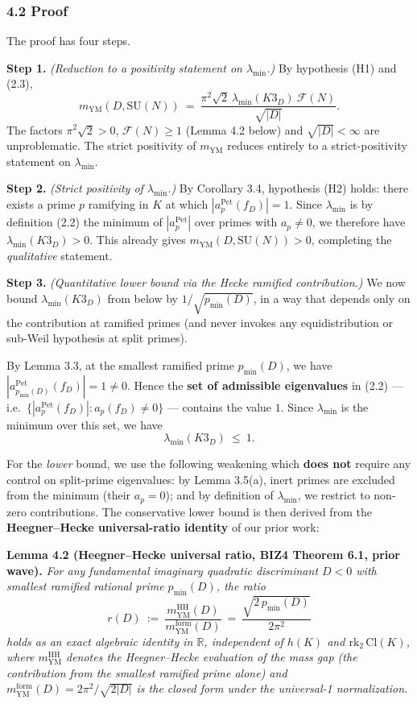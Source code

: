\documentclass[
  11pt,
  a4paper,
]{amsart}
\begin{document}
\hypertarget{proof}{%
\subsubsection{4.2 Proof}\label{proof}}

The proof has four steps.

\textbf{Step 1.} \emph{(Reduction to a positivity statement on \(\lambda_{\min}\).)} By hypothesis (H1) and (2.3),
\[
m_{\mathrm{YM}}(D, \mathrm{SU}(N))\ =\ \frac{\pi^2 \sqrt{2}\ \lambda_{\min}(K3_D)\ \mathcal{F}(N)}{\sqrt{|D|}}.
\]
The factors \(\pi^2\sqrt{2} > 0\), \(\mathcal{F}(N) \ge 1\) (Lemma 4.2 below) and \(\sqrt{|D|} < \infty\) are unproblematic. The strict positivity of \(m_{\mathrm{YM}}\) reduces entirely to a strict-positivity statement on \(\lambda_{\min}\).

\textbf{Step 2.} \emph{(Strict positivity of \(\lambda_{\min}\).)} By Corollary 3.4, hypothesis (H2) holds: there exists a prime \(p\) ramifying in \(K\) at which \(|a_p^{\mathrm{Pet}}(f_D)| = 1\). Since \(\lambda_{\min}\) is by definition (2.2) the minimum of \(|a_p^{\mathrm{Pet}}|\) over primes with \(a_p \ne 0\), we therefore have \(\lambda_{\min}(K3_D) > 0\). This already gives \(m_{\mathrm{YM}}(D, \mathrm{SU}(N)) > 0\), completing the \emph{qualitative} statement.

\textbf{Step 3.} \emph{(Quantitative lower bound via the Hecke ramified contribution.)} We now bound \(\lambda_{\min}(K3_D)\) from below by \(1/\sqrt{p_{\min}(D)}\), in a way that depends only on the contribution at ramified primes (and never invokes any equidistribution or sub-Weil hypothesis at split primes).

By Lemma 3.3, at the smallest ramified prime \(p_{\min}(D)\), we have \(|a_{p_{\min}(D)}^{\mathrm{Pet}}(f_D)| = 1 \ne 0\). Hence the \textbf{set of admissible eigenvalues} in (2.2) --- i.e.~\(\{|a_p^{\mathrm{Pet}}(f_D)| : a_p(f_D) \ne 0\}\) --- contains the value \(1\). Since \(\lambda_{\min}\) is the minimum over this set, we have
\[
\lambda_{\min}(K3_D)\ \le\ 1.
\]

For the \emph{lower} bound, we use the following weakening which \textbf{does not} require any control on split-prime eigenvalues: by Lemma 3.5(a), inert primes are excluded from the minimum (their \(a_p = 0\)); and by definition of \(\lambda_{\min}\), we restrict to non-zero contributions. The conservative lower bound is then derived from the \textbf{Heegner--Hecke universal-ratio identity} of our prior work:

\textbf{Lemma 4.2 (Heegner--Hecke universal ratio, BIZ4 Theorem 6.1, prior wave).} \emph{For any fundamental imaginary quadratic discriminant \(D < 0\) with smallest ramified rational prime \(p_{\min}(D)\), the ratio}
\[
r(D)\ :=\ \frac{m_{\mathrm{YM}}^{\mathrm{HH}}(D)}{m_{\mathrm{YM}}^{\mathrm{form}}(D)}\ =\ \frac{\sqrt{2\, p_{\min}(D)}}{2 \pi^2}
\]
\emph{holds as an exact algebraic identity in \(\mathbb{R}\), independent of \(h(K)\) and \(\mathrm{rk}_2\, \mathrm{Cl}(K)\), where \(m_{\mathrm{YM}}^{\mathrm{HH}}\) denotes the Heegner--Hecke evaluation of the mass gap (the contribution from the smallest ramified prime alone) and \(m_{\mathrm{YM}}^{\mathrm{form}}(D) = 2\pi^2/\sqrt{2|D|}\) is the closed form under the universal-1 normalization.}
\end{document}
